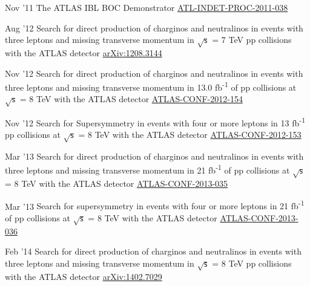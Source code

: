 \documentclass[]{cv} %
\begin{document}
\begin{entrylist}

  \entry
  {Nov '11}
  {{\normalfont The ATLAS IBL BOC Demonstrator}}
  {\href{https://cds.cern.ch/record/1401224}{ATL-INDET-PROC-2011-038}}
  {\vspace*{-8pt}}

  \entry
  {Aug '12}
  {{\normalfont Search for direct production of charginos and neutralinos in events with three leptons and missing transverse momentum in $\sqrt{\mathsf{s}}$ =
  7 TeV pp collisions with the ATLAS detector}}
  {\href{http://arxiv.org/abs/1208.3144}{arXiv:1208.3144}}
  {\vspace*{-8pt}}

  \entry
  {Nov '12}
  {{\normalfont Search for direct production of charginos and neutralinos in events with three leptons and missing transverse momentum in 13.0
  fb\textsuperscript{-1} of pp collisions at $\sqrt{\mathsf{s}}$ = 8 TeV with the ATLAS detector}}
  {\href{https://cds.cern.ch/record/1493493}{ATLAS-CONF-2012-154}}
  {\vspace*{-8pt}}

  \entry
  {Nov '12}
  {{\normalfont Search for Supersymmetry in events with four or more leptons in 13 fb\textsuperscript{-1} pp collisions at $\sqrt{\mathsf{s}}$
  = 8 TeV with the ATLAS detector}}
  {\href{https://cds.cern.ch/record/1493492}{ATLAS-CONF-2012-153}}
  {\vspace*{-8pt}}

  \entry
  {Mar '13}
  {{\normalfont Search for direct production of charginos and neutralinos in events with three leptons and missing transverse momentum in 21
    fb\textsuperscript{-1} of pp
  collisions at $\sqrt{\mathsf{s}}$ = 8 TeV with the ATLAS detector}}
  {\href{https://cds.cern.ch/record/1532426}{ATLAS-CONF-2013-035}}
  {\vspace*{-8pt}}

  \entry
  {Mar '13}
  {{\normalfont Search for supersymmetry in events with four or more leptons in 21 fb\textsuperscript{-1} of pp collisions at
  $\sqrt{\mathsf{s}}$ = 8 TeV with the ATLAS
detector}}
{\href{https://cds.cern.ch/record/1532429}{ATLAS-CONF-2013-036}}
{\vspace*{-8pt}}

  \entry
  {Feb '14}
  {{\normalfont Search for direct production of charginos and neutralinos in events with three leptons and missing transverse momentum in $\sqrt{\mathsf{s}}$ =
  8 TeV pp collisions with the ATLAS detector}}
  {\href{http://arxiv.org/abs/1402.7029}{arXiv:1402.7029}}
  {\vspace*{-8pt}}

\end{entrylist}
\end{document}
